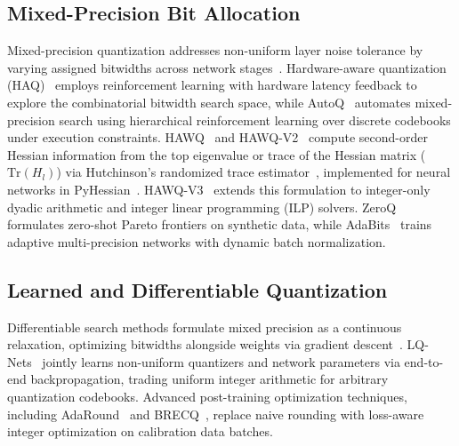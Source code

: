 \documentclass{ieeeaccess}
\begin{document}
\subsection{Mixed-Precision Bit Allocation}
Mixed-precision quantization addresses non-uniform layer noise tolerance by varying assigned bitwidths across network stages~\cite{wang2019haq, dong2019hawq, dong2020hawqv2, yao2021hawqv3, cai2020zeroq, jin2020adabits, wu2018mixed}. Hardware-aware quantization (HAQ)~\cite{wang2019haq} employs reinforcement learning with hardware latency feedback to explore the combinatorial bitwidth search space, while AutoQ~\cite{lou2020autoq} automates mixed-precision search using hierarchical reinforcement learning over discrete codebooks under execution constraints. HAWQ~\cite{dong2019hawq} and HAWQ-V2~\cite{dong2020hawqv2} compute second-order Hessian information from the top eigenvalue or trace of the Hessian matrix ($\text{Tr}(H_l)$) via Hutchinson's randomized trace estimator~\cite{hutchinson1990stochastic}, implemented for neural networks in PyHessian~\cite{yao2020pyhessian}. HAWQ-V3~\cite{yao2021hawqv3} extends this formulation to integer-only dyadic arithmetic and integer linear programming (ILP) solvers. ZeroQ~\cite{cai2020zeroq} formulates zero-shot Pareto frontiers on synthetic data, while AdaBits~\cite{jin2020adabits} trains adaptive multi-precision networks with dynamic batch normalization.

\subsection{Learned and Differentiable Quantization}
Differentiable search methods formulate mixed precision as a continuous relaxation, optimizing bitwidths alongside weights via gradient descent~\cite{uhlich2020mixed, gong2019differentiable}. LQ-Nets~\cite{zhang2018lqnets} jointly learns non-uniform quantizers and network parameters via end-to-end backpropagation, trading uniform integer arithmetic for arbitrary quantization codebooks. Advanced post-training optimization techniques, including AdaRound~\cite{nagel2020adaround} and BRECQ~\cite{li2021brecq}, replace naive rounding with loss-aware integer optimization on calibration data batches.
\end{document}
